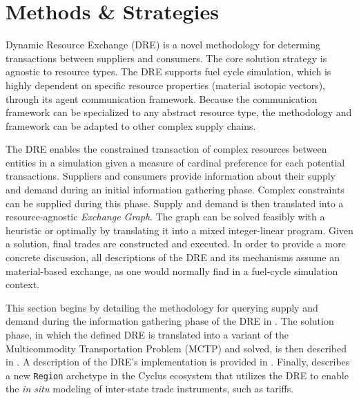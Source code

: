 



\section{Methods \& Strategies}

Dynamic Resource Exchange (DRE) is a novel methodology for determing
transactions between suppliers and consumers. The core solution strategy is
agnostic to resource types. The DRE supports fuel cycle simulation, which is
highly dependent on specific resource properties (material isotopic vectors),
through its agent communication framework. Because the communication framework
can be specialized to any abstract resource type, the methodology and framework
can be adapted to other complex supply chains.

The DRE enables the constrained transaction of complex resources between
entities in a simulation given a measure of cardinal preference for each
potential transactions. Suppliers and consumers provide information about their
supply and demand during an initial information gathering phase. Complex
constraints can be supplied during this phase. Supply and demand is then
translated into a resource-agnostic \textit{Exchange Graph}. The graph can be
solved feasibly with a heuristic or optimally by translating it into a mixed
integer-linear program. Given a solution, final trades are constructed and
executed. In order to provide a more concrete discussion, all descriptions of
the DRE and its mechanisms assume an material-based exchange, as one would
normally find in a fuel-cycle simulation context.

This section begins by detailing the methodology for querying supply and demand
during the information gathering phase of the DRE in . The
solution phase, in which the defined DRE is translated into a variant of the
Multicommodity Transportation Problem (MCTP) and solved, is then described in
. A description of the DRE's implementation is provided in
. Finally,  describes a new
\texttt{Region} archetype in the Cyclus ecosystem that utilizes the DRE to
enable the \textit{in situ} modeling of inter-state trade instruments, such as
tariffs.

